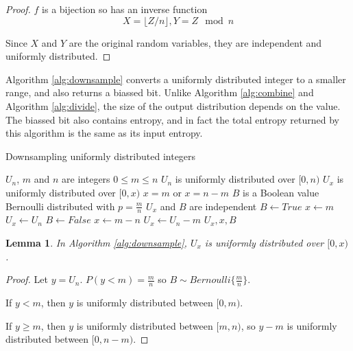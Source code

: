 \documentclass[12pt]{article}
\newtheorem{lemma}{Lemma}
\begin{document}
\begin{proof} $f$ is a bijection so has an inverse function 
\begin{equation}    
X = \lfloor Z/n \rfloor, Y = Z \mod n
\end{equation}

Since $X$ and $Y$ are the original random variables, they are independent and uniformly distributed.
\end{proof}

Algorithm \ref{alg:downsample} converts a uniformly distributed integer to a smaller range, and also returns a biassed bit. Unlike Algorithm \ref{alg:combine} and Algorithm \ref{alg:divide}, the size of the output distribution depends on the value. The biassed bit also contains entropy, and in fact the total entropy returned by this algorithm is the same as its input entropy.

\begin{algorithm}
\caption{Downsampling uniformly distributed integers}
\label{alg:downsample}
\begin{algorithmic}[1]
    \Require $U_{n}$, $m$ and $n$ are integers 
    \Require $0 \le m \le n$
    \Require $U_{n}$ is uniformly distributed over $[0,n)$
\Ensure $U_{x}$ is uniformly distributed over $[0,x)$
\Ensure $x = m$ or $x=n-m$
\Ensure $B$ is a Boolean value Bernoulli distributed with $p=\frac{m}{n}$
\Ensure $U_x$ and $B$ are independent
    \State $B \gets True$  
    \State $x \gets m$
    \State $U_x \gets U_n$
  \Else
    \State $B \gets False$  
    \State $x \gets m-n$
    \State $U_x \gets U_n-m$
  \EndIf
  \State \Return $U_x, x, B$
\EndProcedure
\end{algorithmic}
\end{algorithm}

\begin{lemma}
In Algorithm \ref{alg:downsample}, $U_x$ is uniformly distributed over $[0,x)$.
\label{lem:downsample}
\end{lemma}

\begin{proof}
    Let $y = U_n$.
    $P(y<m) = \frac{m}{n}$ so $B \sim Bernoulli\{\frac{m}{n}\}$.

If $y < m$, then $y$ is uniformly distributed between $[0,m)$.

If $y \ge m$, then $y$ is uniformly distributed between $[m, n)$, so $y-m$ is uniformly distributed between $[0, n-m)$.
\end{proof}
\end{document}
